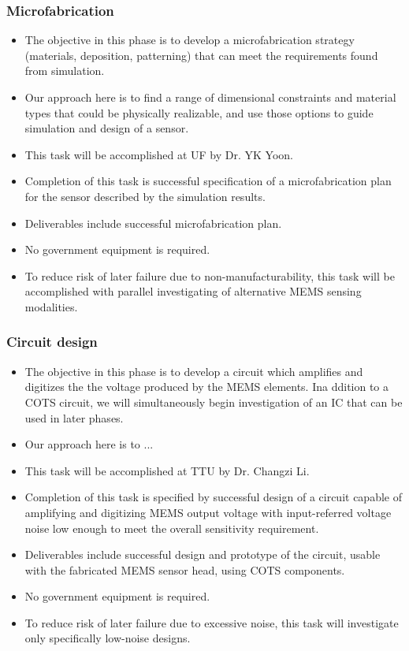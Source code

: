 \subsubsection{Microfabrication}\label{sec:p1:mf}
\begin{itemize}
\item The objective in this phase is to develop a microfabrication strategy (materials, deposition, patterning) that can meet the requirements found from simulation.
\item Our approach here is to find a range of dimensional constraints and material types that could be physically realizable, and use those options to guide simulation and design of a sensor.
\item This task will be accomplished at UF by Dr. YK Yoon.
\item Completion of this task is successful specification of a microfabrication plan for the sensor described by the simulation results.
\item Deliverables include successful microfabrication plan.
\item No government equipment is required.
\item To reduce risk of later failure due to non-manufacturability, this task will be accomplished with parallel investigating of alternative MEMS sensing modalities.
\end{itemize}
\subsubsection{Circuit design}\label{sec:p1:cir}
\begin{itemize}
\item The objective in this phase is to develop a circuit which amplifies and digitizes the the voltage produced by the MEMS elements. Ina ddition to a COTS circuit, we will simultaneously begin investigation of an IC that can be used in later phases.
\item Our approach here is to ...
\item This task will be accomplished at TTU by Dr. Changzi Li.
\item Completion of this task is specified by successful design of a circuit capable of amplifying and digitizing MEMS output voltage with input-referred voltage noise low enough to meet the overall sensitivity requirement.
\item Deliverables include successful design and prototype of the circuit, usable with the fabricated MEMS sensor head, using COTS components.
\item No government equipment is required.
\item To reduce risk of later failure due to excessive noise, this task will investigate only specifically low-noise designs.
\end{itemize}
